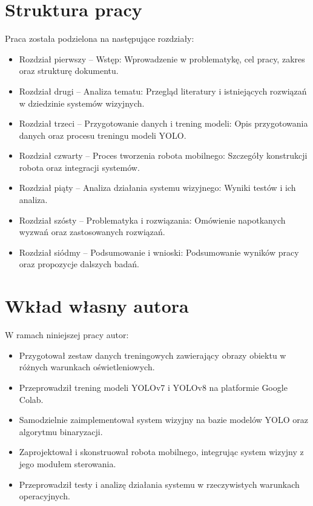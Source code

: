 \documentclass[a4paper,twoside,12pt]{book}
\begin{document}
\section{Struktura pracy}

Praca została podzielona na następujące rozdziały:
\begin{itemize}
    \item Rozdział pierwszy – Wstęp: Wprowadzenie w problematykę, cel pracy, zakres oraz strukturę dokumentu.
    \item Rozdział drugi – Analiza tematu: Przegląd literatury i istniejących rozwiązań w dziedzinie systemów wizyjnych.
    \item Rozdział trzeci – Przygotowanie danych i trening modeli: Opis przygotowania danych oraz procesu treningu modeli YOLO.
    \item Rozdział czwarty – Proces tworzenia robota mobilnego: Szczegóły konstrukcji robota oraz integracji systemów.
    \item Rozdział piąty – Analiza działania systemu wizyjnego: Wyniki testów i ich analiza.
    \item Rozdział szósty – Problematyka i rozwiązania: Omówienie napotkanych wyzwań oraz zastosowanych rozwiązań.
    \item Rozdział siódmy – Podsumowanie i wnioski: Podsumowanie wyników pracy oraz propozycje dalszych badań.
\end{itemize}

\newpage

\section{Wkład własny autora}
W ramach niniejszej pracy autor:
\begin{itemize}
    \item Przygotował zestaw danych treningowych zawierający obrazy obiektu w różnych warunkach oświetleniowych.
    \item Przeprowadził trening modeli YOLOv7 i YOLOv8 na platformie Google Colab.
    \item Samodzielnie zaimplementował system wizyjny na bazie modelów YOLO oraz algorytmu binaryzacji.
    \item Zaprojektował i skonstruował robota mobilnego, integrując system wizyjny z jego modułem sterowania.
    \item Przeprowadził testy i analizę działania systemu w rzeczywistych warunkach operacyjnych.
\end{itemize}
\end{document}
